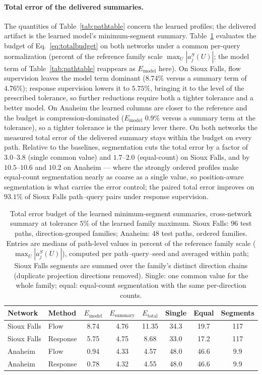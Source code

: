 \paragraph{Total error of the delivered summaries.}
The quantities of Table~\ref{tab:pathtable} concern the learned
profiles; the delivered artifact is the learned model's minimum-segment
summary. Table~\ref{tab:totalerror} evaluates the budget of
Eq.~\eqref{eq:totalbudget} on both networks under a common
per-query normalization (percent of the reference family scale
$\max_U|a^S_j(U)|$; the model term of Table~\ref{tab:pathtable}
reappears as $E_{\mathrm{model}}$ here). On Sioux Falls, flow
supervision leaves the model term dominant ($8.74\%$ versus a summary
term of $4.76\%$); response supervision lowers it to $5.75\%$, bringing
it to the level of the prescribed tolerance, so further reductions
require both a tighter tolerance and a better model. On Anaheim the
learned columns are closer to the reference and the budget is
compression-dominated ($E_{\mathrm{model}}$ $0.9\%$ versus a summary
term at the tolerance), so a tighter tolerance is the primary lever
there. On both networks the measured total error of the delivered
summary stays within the budget on every path. Relative to the
baselines, segmentation cuts the total error by a factor of
$3.0$--$3.8$ (single common value) and $1.7$--$2.0$ (equal-count) on
Sioux Falls, and by $10.5$--$10.6$ and $10.2$ on Anaheim --- where the
strongly ordered profiles make equal-count segmentation nearly as
coarse as a single value, so position-aware segmentation is what
carries the error control; the paired total error improves on $93.1\%$
of Sioux Falls path--query pairs under response supervision.
\begin{table}[t]\centering\footnotesize
\caption{Total error budget of the learned minimum-segment summaries,
cross-network summary at tolerance $5\%$ of the learned family
maximum. Sioux Falls: 96 test paths, direction-grouped families;
Anaheim: 48 test paths, ordered families. Entries are medians of
path-level values in percent of the reference family scale
($\max_U|a^S_j(U)|$), computed per path--query--seed and averaged
within path; Sioux Falls segments are summed over the family's
distinct direction chains (duplicate projection directions removed).
Single: one common value for the whole family; equal: equal-count
segmentation with the same per-direction
counts.}\label{tab:totalerror}
\setlength{\tabcolsep}{4.5pt}
\begin{tabular*}{\tblwidth}{@{\extracolsep{\fill}}llcccccc}
\toprule
Network & Method & $E_{\mathrm{model}}$ & $E_{\mathrm{summary}}$ & $E_{\mathrm{total}}$ & Single & Equal & Segments\\
\midrule
Sioux Falls & Flow & 8.74 & 4.76 & 11.35 & 34.3 & 19.7 & 117\\
Sioux Falls & Response & 5.75 & 4.75 & 8.68 & 33.0 & 17.2 & 117\\
\addlinespace
Anaheim & Flow & 0.94 & 4.33 & 4.57 & 48.0 & 46.6 & 9.9\\
Anaheim & Response & 0.78 & 4.32 & 4.55 & 48.0 & 46.6 & 9.9\\
\bottomrule\end{tabular*}\end{table}

